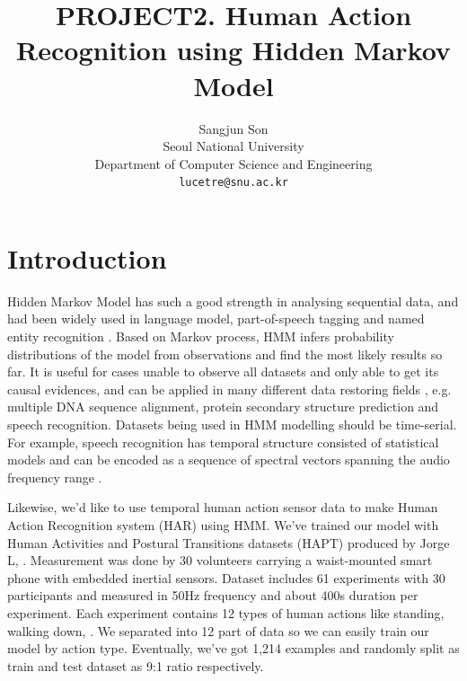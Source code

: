 \documentclass[10pt,twocolumn,letterpaper]{article}
\begin{document}
\title{PROJECT2. Human Action Recognition using Hidden Markov Model}

\author{Sangjun Son\\
Seoul National University\\
Department of Computer Science and Engineering\\
{\tt\small lucetre@snu.ac.kr}
}

\maketitle

\section{Introduction}

Hidden Markov Model has such a good strength in analysing sequential data, and had been widely used in language model, part-of-speech tagging and named entity recognition \cite{ratgo}. Based on Markov process, HMM infers probability distributions of the model from observations and find the most likely results so far. It is useful for cases unable to observe all datasets and only able to get its causal evidences, and can be applied in many different data restoring fields \cite{hmmwiki}, e.g. multiple DNA sequence alignment, protein secondary structure prediction \cite{biology} and speech recognition. Datasets being used in HMM modelling should be time-serial. For example, speech recognition has temporal structure consisted of statistical models and can be encoded as a sequence of spectral vectors spanning the audio frequency range \cite{speechrecognition}.

Likewise, we'd like to use temporal human action sensor data to make Human Action Recognition system (HAR) using HMM. We've trained our model with  Human Activities and Postural Transitions datasets (HAPT) produced by Jorge L, \etal \cite{hapt}. Measurement was done by 30 volunteers carrying a waist-mounted smart phone with embedded inertial sensors. Dataset includes 61 experiments with 30 participants and measured in 50Hz frequency and about 400s duration per experiment. Each experiment contains 12 types of human actions like standing, walking down, \etc. We separated into 12 part of data so we can easily train our model by action type. Eventually, we've got 1,214 examples and randomly split as train and test dataset as 9:1 ratio respectively.

\end{document}
